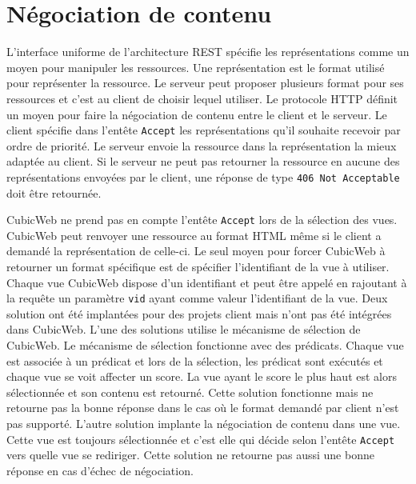 \section{Négociation de contenu} 
L'interface uniforme de l'architecture REST spécifie les représentations comme un moyen pour manipuler les ressources. Une représentation est le format utilisé pour représenter la ressource. Le serveur peut proposer plusieurs format pour ses ressources et c'est au client de choisir lequel utiliser. Le protocole HTTP définit un moyen pour faire la négociation de contenu entre le client et le serveur. Le client spécifie dans l'entête \texttt{Accept} les représentations qu'il souhaite recevoir par ordre de priorité. Le serveur envoie la ressource dans la représentation la mieux adaptée au client. Si le serveur ne peut pas retourner la ressource en aucune des représentations envoyées par le client, une réponse de type \texttt{406~Not~Acceptable} doit être retournée.

CubicWeb ne prend pas en compte l'entête \texttt{Accept} lors de la sélection des vues. CubicWeb peut renvoyer une ressource au format HTML même si le client a demandé la représentation  de celle-ci. Le seul moyen pour forcer CubicWeb à retourner un format spécifique est de spécifier l'identifiant de la vue à utiliser. Chaque vue CubicWeb dispose d'un identifiant et peut être appelé en rajoutant à la requête un paramètre \texttt{vid} ayant comme valeur l'identifiant de la vue. Deux solution ont été implantées pour des projets client mais n'ont pas été intégrées dans CubicWeb. L'une des solutions utilise le mécanisme de sélection de CubicWeb. Le mécanisme de sélection fonctionne avec des prédicats. Chaque vue est associée à un prédicat et lors de la sélection, les prédicat sont exécutés et chaque vue se voit affecter un score. La vue ayant le score le plus haut est alors sélectionnée et son contenu est retourné. Cette solution fonctionne mais ne retourne pas la bonne réponse dans le cas où le format demandé par client n'est pas supporté. L'autre solution implante la négociation de contenu dans une vue. Cette vue est toujours sélectionnée et c'est elle qui décide selon l'entête \texttt{Accept} vers quelle vue se rediriger. Cette solution ne retourne pas aussi une bonne réponse en cas d'échec de négociation.

